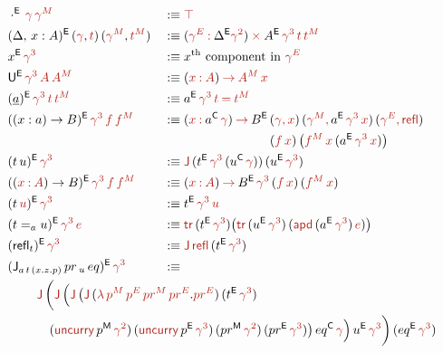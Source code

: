 \documentclass[a4paper,UKenglish]{lipics-v2018}
\newcommand{\U}{\mathsf{U}}
\newcommand{\ra}{\rightarrow}
\newcommand{\C}{\mathsf{C}}
\newcommand{\M}{\mathsf{M}}
\newcommand{\refl}{\mathsf{refl}}
\newcommand{\1}{\mathsf{1}} \renewcommand{\Pr}{\mathsf{Pr}}
\renewcommand{\in}{\mathbin{\hat:}}
\renewcommand{\hat}[1]{{\color{BrickRed}{#1}}}
\newcommand{\rah}{\mathbin{\hat\ra}}
\newcommand{\timesh}{\mathbin{\hat\times}}
\newcommand{\eqh}{\mathbin{\hat=}}
\newcommand{\TR}{\hat{\mathsf{tr}}}
\newcommand{\apd}{\hat{\mathsf{apd}}}
\begin{document}
\begin{alignat*}{5}
  & \cdot^\E\,\hat{\gamma}\,\hat{\gamma^M} && :\equiv \hat{\top} \\
  & (\Delta,\,x:A)^\E\,(\hat{\gamma},\hat{t})\,(\hat{\gamma^M},\hat{t^M}) && :\equiv (\hat{\gamma^E}\in\Delta^\E\hat{\gamma^2})\timesh A^\E\,\hat{\gamma^3}\,\hat{t}\,\hat{t^M} \\
  & x^\E\,\hat{\gamma^3} && :\equiv x^{\text{th}}\text{ component in } \hat{\gamma^E} \\ %
  & \U^\E\,\hat{\gamma^3}\,\hat{A}\,\hat{A^M} && :\equiv (\hat{x}\in \hat{A})\rah  \hat{A^M}\,\hat{x} \\
  & (\underline{a})^\E\,\hat{\gamma^3}\,\hat{t}\,\hat{t^M} && :\equiv a^\E\,\hat{\gamma^3}\,\hat{t} \eqh \hat{t^M} \\
  & ((x:a)\ra B)^\E\,\hat{\gamma^3}\,\hat{f}\,\hat{f^M} && :\equiv (\hat{x}\in a^\C\,\hat{\gamma})\rah  B^\E\,(\hat{\gamma,x})\,(\hat{\gamma^M,}\,a^\E\,\hat{\gamma^3}\,\hat{x})\,(\hat{\gamma^E,}\,\hat{\refl}) \\
  & && \hspace{8.4em} (\hat{f}\,\hat{x})\,\big(\hat{f^M}\,\hat{x}\,(a^\E\,\hat{\gamma^3}\,\hat{x})\big) \\
  & (t\,u)^\E\,\hat{\gamma^3} && :\equiv \hat{\J}\,(t^\E\,\hat{\gamma^3}\,( u^\C\,\hat{\gamma}))\,(u^\E\,\hat{\gamma^3}) \\
  & ((\hat{x}\in \hat{A})\ra B)^\E\,\hat{\gamma^3}\,\hat{f}\,\hat{f^M} && :\equiv (\hat{x}\in \hat{A})\rah B^\E\,\hat{\gamma^3}\,(\hat{f}\,\hat{x})\,(\hat{f^M}\,\hat{x}) \\
  & (t\,\hat{u})^\E\,\hat{\gamma^3} && :\equiv t^\E\,\hat{\gamma^3}\,\hat{u} \\
  & (t=_a u)^\E\,\hat{\gamma^3}\,\hat{e} && :\equiv \TR\,(t^\E\,\hat{\gamma^3})\big(\TR\,(u^\E\,\hat{\gamma^3})\,(\apd\,(a^\E\,\hat{\gamma^3})\,\hat{e})\big) \\
  & (\refl_t)^\E\,\hat{\gamma^3} && :\equiv \hat{\J}\,\hat{\refl}\,(t^\E\,\hat{\gamma^3}) \\
  & (\J_{a\,t\,(x.z.p)}\,pr\,_u\,eq)^\E\,\hat{\gamma^3} && :\equiv \\
  & && \hspace{-10em}\hat{\J}\,\bigg(\hat{\J}\,\Big(\hat{\J}\,\big(\hat{\J}\,(\hat{\lambda}\,\hat{p^M}\,\hat{p^E}\,\hat{pr^M}\,\hat{pr^E}.\hat{pr^E})\,(t^\E\,\hat{\gamma^3})\,\\
  & && \hspace{-9em}(\hat{\mathsf{uncurry}}\,p^\M\,\hat{\gamma^2})\,(\hat{\mathsf{uncurry}}\,p^\E\,\hat{\gamma^3})\,(pr^\M\,\hat{\gamma^2})\,(pr^\E\,\hat{\gamma^3})\big)\,eq^\C\,\hat{\gamma}\Big)\,u^\E\,\hat{\gamma^3}\bigg)\,(eq^\E\,\hat{\gamma^3}) \\

\end{alignat*}
\end{document}
